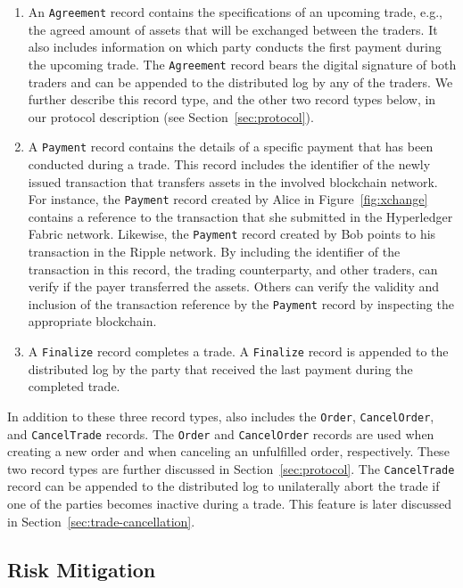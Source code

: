 \begin{enumerate}
	\item An \texttt{Agreement} record contains the specifications of an upcoming trade, e.g., the agreed amount of assets that will be exchanged between the traders.
	It also includes information on which party conducts the first payment during the upcoming trade.
	The \texttt{Agreement} record bears the digital signature of both traders and can be appended to the distributed log by any of the traders.
	We further describe this record type, and the other two record types below, in our protocol description (see Section~\ref{sec:protocol}).
	\item A \texttt{Payment} record contains the details of a specific payment that has been conducted during a trade.
	This record includes the identifier of the newly issued transaction that transfers assets in the involved blockchain network.
	For instance, the \texttt{Payment} record created by Alice in Figure~\ref{fig:xchange} contains a reference to the transaction that she submitted in the Hyperledger Fabric network.
	Likewise, the \texttt{Payment} record created by Bob points to his transaction in the Ripple network.
	By including the identifier of the transaction in this record, the trading counterparty, and other traders, can verify if the payer transferred the assets.
	Others can verify the validity and inclusion of the transaction reference by the \texttt{Payment} record by inspecting the appropriate blockchain.
	\item A \texttt{Finalize} record completes a trade.
	A \texttt{Finalize} record is appended to the distributed log by the party that received the last payment during the completed trade.
\end{enumerate}

In addition to these three record types, \ModelName{} also includes the \texttt{Order}, \texttt{CancelOrder}, and \texttt{CancelTrade} records.
The \texttt{Order} and \texttt{CancelOrder} records are used when creating a new order and when canceling an unfulfilled order, respectively.
These two record types are further discussed in Section~\ref{sec:protocol}.
The \texttt{CancelTrade} record can be appended to the distributed log to unilaterally abort the trade if one of the parties becomes inactive during a trade.
This feature is later discussed in Section~\ref{sec:trade-cancellation}.

\subsection{Risk Mitigation}
\label{sec:limit_risk}

